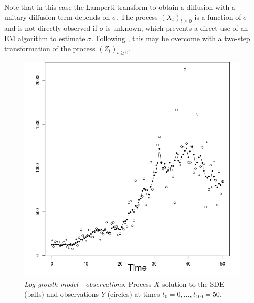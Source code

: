 \documentclass[12pt]{article}
\newcommand{\1}{\mathrm{1}}
\begin{document}
Note that in this case the Lamperti transform to obtain a diffusion with a unitary diffusion term depends on $\sigma$. 
The process $(X_t)_{t\ge 0}$ is a function of $\sigma$ and is not directly observed if $\sigma$ is unknown, which prevents a direct use of an EM algorithm to estimate $\sigma$. 
Following \cite[Section~8.2]{beskos:papaspiliopoulos:roberts:fearnhead:2006}, this may be overcome with a two-step transformation of the process $(Z_t)_{t\ge 0}$.
\begin{figure}[p]
\centering
\includegraphics[scale=0.5]{obs_LG}
\caption{{\em Log-growth model - observations}.
 Process $X$ solution to the SDE (balls) and observations $Y$ (circles) at times $t_0=0,\dots,t_{100}=50$.}
\label{fig:res:LG:obs}
\end{figure}
\end{document}
